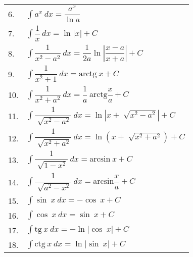 \documentclass{article}
\begin{document}
\begin{table}[!ht]
\begin{minipage}{0.5\linewidth}
\begin{tabular}{|m{1cm}|m{6.5cm}|}
      6.           & $\displaystyle\int a^x\ dx = \dfrac{a^x}{\ln a} $                                                             \\

      7.           & $\displaystyle\int \dfrac{1}{x}\ dx = \ln \left\lvert x \right\rvert + C $                                    \\

      8.           & $\displaystyle\int \dfrac{1}{x^2-a^2}\ dx = \dfrac{1}{2a} \ln \left\lvert \dfrac{x-a}{x+a} \right\rvert + C $ \\

      9.           & $\displaystyle\int \dfrac{1}{x^2+1}\ dx = \text{arctg}\ x + C $                                               \\

      10.          & $\displaystyle\int \dfrac{1}{x^2+a^2}\ dx = \dfrac{1}{a}\ \text{arctg} \dfrac{x}{a} + C $                     \\

      11.          & $\displaystyle\int \dfrac{1}{\sqrt[]{x^2-a^2}}\ dx = \ln \left\lvert x + \sqrt[]{x^2-a^2} \right\rvert + C $  \\

      12.          & $\displaystyle\int \dfrac{1}{\sqrt[]{x^2+a^2}}\ dx = \ln \left( x+\sqrt[]{x^2+a^2} \right) + C $              \\

      13.          & $\displaystyle\int \dfrac{1}{\sqrt[]{1-x^2}}\ dx = \text{arcsin}\ x + C $                                     \\

      14.          & $\displaystyle\int \dfrac{1}{\sqrt[]{a^2-x^2}}\ dx = \text{arcsin} \dfrac{x}{a} + C $                         \\

      15.          & $\displaystyle\int \sin\ x\ dx = -\cos\ x + C $                                                               \\

      16.          & $\displaystyle\int \cos\ x\ dx = \sin\ x + C $                                                                \\

      17.          & $\displaystyle\int \text{tg}\ x\ dx = -\ln\left\lvert \cos\ x \right\rvert + C $                              \\

      18.          & $\displaystyle\int \text{ctg}\ x\ dx = \ln \left\lvert \sin\ x\right\rvert + C $                              \\


\end{tabular}
\end{minipage}
\end{table}
\end{document}
